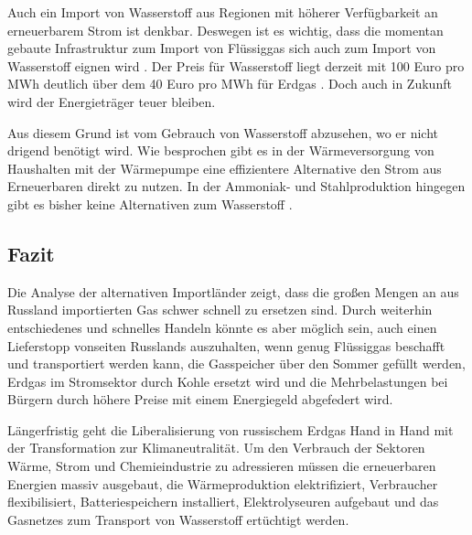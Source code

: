 Auch ein Import von Wasserstoff aus Regionen mit höherer Verfügbarkeit an erneuerbarem Strom ist denkbar. Deswegen ist es wichtig, dass die momentan gebaute Infrastruktur zum Import von Flüssiggas sich auch zum Import von Wasserstoff eignen wird \cite{leo}.
Der Preis für Wasserstoff liegt derzeit mit 100 Euro pro MWh deutlich über dem 40 Euro pro MWh für Erdgas \cite{rnd}. Doch auch in Zukunft wird der Energieträger teuer bleiben.

Aus diesem Grund ist vom Gebrauch von Wasserstoff abzusehen, wo er nicht drigend benötigt wird. Wie besprochen gibt es in der Wärmeversorgung von Haushalten mit der Wärmepumpe eine effizientere Alternative den Strom aus Erneuerbaren direkt zu nutzen. In der Ammoniak- und Stahlproduktion hingegen gibt es bisher keine Alternativen zum Wasserstoff \cite{kopernikus}.

\subsection{Fazit}

Die Analyse der alternativen Importländer zeigt, dass die großen Mengen an aus Russland importierten Gas schwer schnell zu ersetzen sind. Durch weiterhin entschiedenes und schnelles Handeln könnte es aber möglich sein, auch einen Lieferstopp vonseiten Russlands auszuhalten, wenn genug Flüssiggas beschafft und transportiert werden kann, die Gasspeicher über den Sommer gefüllt werden, Erdgas im Stromsektor durch Kohle ersetzt wird und die Mehrbelastungen bei Bürgern durch höhere Preise mit einem Energiegeld abgefedert wird. 

Längerfristig geht die Liberalisierung von russischem Erdgas Hand in Hand mit der Transformation zur Klimaneutralität. Um den Verbrauch der Sektoren Wärme, Strom und Chemieindustrie zu adressieren müssen die erneuerbaren Energien massiv ausgebaut, die Wärmeproduktion elektrifiziert, Verbraucher flexibilisiert, Batteriespeichern installiert, Elektrolyseuren aufgebaut und das Gasnetzes zum Transport von Wasserstoff ertüchtigt werden.